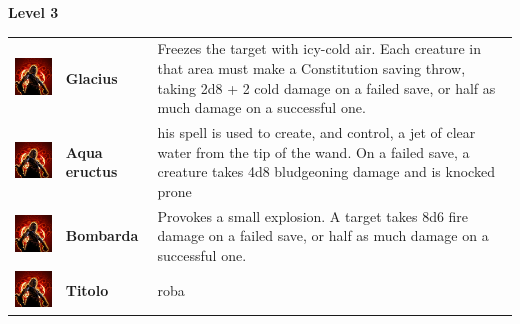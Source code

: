 \textbf{Level 3} 
\begin{tabular}{ m{4cm}m{3cm}m{6cm} } 
	\includegraphics[width=4cm]{../Pictures/Gameplay/Spells/Icon/spell_icon.png} & \textbf{Glacius} & Freezes the target with icy-cold air. Each creature in that area must make a Constitution saving throw, taking 2d8 + 2 cold damage on a failed save, or half as much damage on a successful one. \\ 
	\includegraphics[width=4cm]{../Pictures/Gameplay/Spells/Icon/spell_icon.png} & \textbf{Aqua eructus} &his spell is used to create, and control, a jet of clear water from the tip of the wand.  On a failed save, a creature takes 4d8 bludgeoning damage and is knocked prone \\ 
	\includegraphics[width=4cm]{../Pictures/Gameplay/Spells/Icon/spell_icon.png} & \textbf{Bombarda} & Provokes a small explosion. A target takes 8d6 fire damage on a failed save, or half as much damage on a successful one.\\ 
	\includegraphics[width=4cm]{../Pictures/Gameplay/Spells/Icon/spell_icon.png} & \textbf{Titolo} & roba \\ 
\end{tabular}

